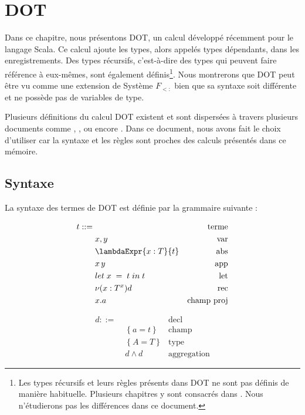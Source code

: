 \chapter{DOT}


Dans ce chapitre, nous présentons DOT, un calcul développé récemment pour le
langage Scala. Ce calcul ajoute les types, alors
appelés types dépendants, dans les enregistrements. Des types
récursifs, c'est-à-dire des types qui peuvent faire référence à eux-mêmes, sont
également définis\footnote{Les types récursifs et leurs règles présents dans DOT ne sont pas
  définis de manière habituelle. Plusieurs chapitres y sont consacrés dans
  \cite{tapl-recursive-types}. Nous n'étudierons pas les différences dans ce document.
}.
Nous montrerons que DOT peut être vu comme une
extension de Système $F_{<:}$ bien que sa syntaxe soit différente et ne possède
pas de variables de type.

Plusieurs définitions du calcul DOT existent et sont dispersées à travers
plusieurs documents comme \cite{nada-amin-thesis}, \cite{OOPSLA-DOT-2016},
\cite{POPL-2017-DOT} ou encore \cite{WF-DOT-2016}. Dans ce document, nous avons
fait le choix d'utiliser \cite{WF-DOT-2016} car la syntaxe et les règles sont
proches des calculs présentés dans ce mémoire.

\section{Syntaxe}

La syntaxe des termes de DOT est définie par la grammaire suivante :
\begin{minipage}{0.45\textwidth}
  \begin{align*}
    t ::= & \, & \text{terme} \\
          & \; x, y & \text{var} \\
          & \; \lambdaExpr{x : T}{t} & \text{abs} \\
          & \; x \, y & \text{app} \\
          & \; \localLetBinding{x}{t}{t} & \text{let} \\
          & \; \nu(x : T^{x})d & \text{rec} \\
          & \; x.a & \text{champ proj} \\
\end{align*}
\end{minipage}
\begin{minipage}{0.45\textwidth}
  \begin{align*}
    d ::= & \, & \text{decl} \\
          & \; \left\{ a = t \right\} & \text{champ} \\
          & \; \left\{ A = T \right\} & \text{type} \\
          & \; d \wedge d & \text{aggregation}
\end{align*}
\end{minipage}

